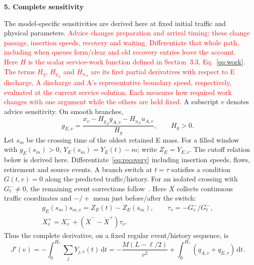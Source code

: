 \documentclass[10pt,a4paper]{article}
\newcommand{\dd}{\,\mathrm d}
\newcommand{\head}[1]{\par\vspace{4pt}\noindent\textbf{#1}\par\nobreak\vspace{1pt}}
\newcommand{\rev}[1]{\textcolor{red}{#1}}
\begin{document}
\newpage
\head{5. Complete sensitivity}
The model-specific sensitivities are derived here at fixed initial traffic
and physical parameters.
\rev{Advice changes preparation and arrival timing; these change passage,
insertion speeds, recovery and waiting. Differentiate that whole path,
including when queues form/clear and old recovery entries leave the account.}
\rev{Here $H$ is the scalar service-work function defined in Section~3.3,
Eq.~\eqref{eq:work}. The terms $H_g$, $H_{g_A}$ and $H_{u_A}$ are its first
partial derivatives with respect to E discharge, A discharge and A's
representative boundary speed, respectively, evaluated at the current
service solution. Each measures how required work changes with one argument
while the others are held fixed.}
A subscript $v$ denotes advice sensitivity. On smooth branches,
\begin{equation}
 g_{E,v}=\frac{x_v-H_{g_A}g_{A,v}-H_{u_A}u_{A,v}}{H_g},\qquad H_g>0.
 \label{eq:rootgradient}
\end{equation}
\begingroup\color{red}
Let $s_m$ be the crossing time of the oldest retained E mass. For a filled
window with $g_E(s_m)>0$, $Y_E(s_m)=Y_E(t)-m$; write $Z_E=Y_{E,v}$.
The cutoff relation below is derived here. Differentiate~\eqref{eq:recovery}
including insertion speeds, flows, retirement and source events. A branch
switch at $t=\tau$ satisfies a condition $G(t,v)=0$ along the predicted
traffic/history. For an isolated crossing with $G_t^-\ne0$, the remaining
event corrections follow~\cite{kong}. Here $X$ collects continuous traffic
coordinates and $-/+$ mean just before/after the switch:
\endgroup
\begin{equation}
 \begin{gathered}
 g_E(s_m)s_{m,v}=Z_E(t)-Z_E(s_m),\qquad \tau_v=-G_v^-/G_t^-,\\
 X_v^+=X_v^-+(\dot X^- -\dot X^+)\tau_v.
 \end{gathered}
 \label{eq:eventgradient}
\end{equation}
Thus the complete derivative, on a fixed regular event/history sequence, is
\begin{equation}
 J'(v)=-\int_0^{H_*}\!\sum_jY_{j,v}(t)\dd t
 =-\frac{M(L-\ell/2)}{v^2}+\int_0^{H_*}(q_{A,v}+q_{E,v})\dd t.
 \label{eq:objectivegradient}
\end{equation}
\makeatletter
\renewcommand{\section}{\@ifstar{\head}{\head}}
\makeatother
\end{document}
